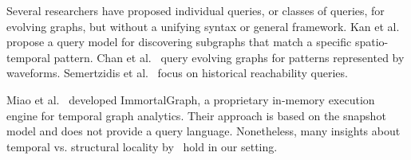 Several researchers have proposed individual queries, or classes of
queries, for evolving graphs, but without a unifying syntax or general
framework.  Kan et al.~\cite{Kan2009} propose a query model for
discovering subgraphs that match a specific spatio-temporal pattern.
Chan et al.~\cite{Chan2008} query evolving graphs for patterns
represented by waveforms.  Semertzidis et al.~\cite{Semertzidis2015}
focus on historical reachability queries.

Miao et al.~\cite{Miao2015} developed ImmortalGraph,
a proprietary in-memory execution engine for temporal graph analytics.
Their approach is based on the snapshot model and
does not provide a query 
language.%
Nonetheless, many insights about temporal vs. structural locality
by~\cite{Miao2015} hold in our setting.

